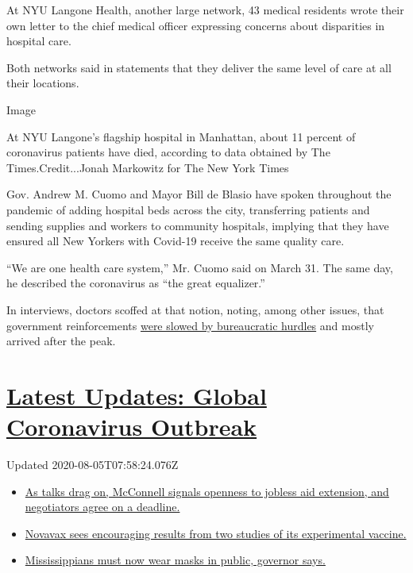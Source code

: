 At NYU Langone Health, another large network, 43 medical residents wrote
their own letter to the chief medical officer expressing concerns about
disparities in hospital care.

Both networks said in statements that they deliver the same level of
care at all their locations.

Image

At NYU Langone's flagship hospital in Manhattan, about 11 percent of
coronavirus patients have died, according to data obtained by The
Times.Credit...Jonah Markowitz for The New York Times

Gov. Andrew M. Cuomo and Mayor Bill de Blasio have spoken throughout the
pandemic of adding hospital beds across the city, transferring patients
and sending supplies and workers to community hospitals, implying that
they have ensured all New Yorkers with Covid-19 receive the same quality
care.

``We are one health care system,'' Mr. Cuomo said on March 31. The same
day, he described the coronavirus as ``the great equalizer.''

In interviews, doctors scoffed at that notion, noting, among other
issues, that government reinforcements
\href{https://www.nytimes3xbfgragh.onion/2020/04/08/nyregion/coronavirus-new-york-volunteers.html}{were
slowed by bureaucratic hurdles} and mostly arrived after the peak.

\hypertarget{latest-updates-global-coronavirus-outbreak}{%
\section{\texorpdfstring{\href{https://www.nytimes3xbfgragh.onion/2020/08/04/world/coronavirus-cases.html?action=click\&pgtype=Article\&state=default\&region=MAIN_CONTENT_1\&context=storylines_live_updates}{Latest
Updates: Global Coronavirus
Outbreak}}{Latest Updates: Global Coronavirus Outbreak}}\label{latest-updates-global-coronavirus-outbreak}}

Updated 2020-08-05T07:58:24.076Z

\begin{itemize}
\tightlist
\item
  \href{https://www.nytimes3xbfgragh.onion/2020/08/04/world/coronavirus-cases.html?action=click\&pgtype=Article\&state=default\&region=MAIN_CONTENT_1\&context=storylines_live_updates\#link-762df92}{As
  talks drag on, McConnell signals openness to jobless aid extension,
  and negotiators agree on a deadline.}
\item
  \href{https://www.nytimes3xbfgragh.onion/2020/08/04/world/coronavirus-cases.html?action=click\&pgtype=Article\&state=default\&region=MAIN_CONTENT_1\&context=storylines_live_updates\#link-1228a480}{Novavax
  sees encouraging results from two studies of its experimental
  vaccine.}
\item
  \href{https://www.nytimes3xbfgragh.onion/2020/08/04/world/coronavirus-cases.html?action=click\&pgtype=Article\&state=default\&region=MAIN_CONTENT_1\&context=storylines_live_updates\#link-794484ed}{Mississippians
  must now wear masks in public, governor says.}
\end{itemize}

